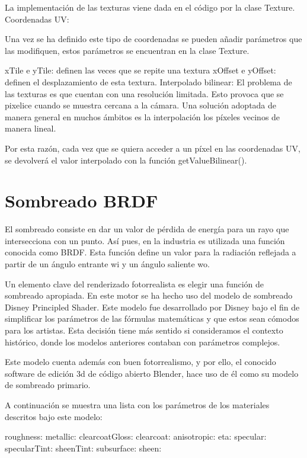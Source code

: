 	La implementación de las texturas viene dada en el código por la clase Texture.
	Coordenadas UV:

	Una vez se ha definido este tipo de coordenadas se pueden añadir parámetros que las modifiquen, estos parámetros se encuentran en la clase Texture.

	xTile e yTile: definen las veces que se repite una textura
	xOffset e yOffset: definen el desplazamiento de esta textura.
	Interpolado bilinear:
	El problema de las texturas es que cuentan con una resolución limitada. Esto provoca que se pixelice cuando se muestra cercana a la cámara. Una solución adoptada de manera general en muchos ámbitos es la interpolación los píxeles vecinos de manera lineal. 




	Por esta razón, cada vez que se quiera acceder a un píxel en las coordenadas UV, se devolverá el valor interpolado con la función getValueBilinear().

	
	\section{Sombreado BRDF}
	
		
	El sombreado consiste en dar un valor de pérdida de energía para un rayo que intersecciona con un punto. Así pues, en la industria es utilizada una función conocida como BRDF. Esta función define un valor para la radiación reflejada a partir de un ángulo entrante wi y un ángulo saliente wo.

	Un elemento clave del renderizado fotorrealista es elegir una función de sombreado apropiada. En este motor se ha hecho uso del modelo de sombreado Disney Principled Shader. Este modelo fue desarrollado por Disney bajo el fin de simplificar los parámetros de las fórmulas matemáticas y que estos sean cómodos para los artistas. Esta decisión tiene más sentido si consideramos el contexto histórico, donde los modelos anteriores contaban con parámetros complejos.

	Este modelo cuenta además con buen fotorrealismo, y por ello, el conocido software de edición 3d de código abierto Blender, hace uso de él como su modelo de sombreado primario.


	A continuación se muestra una lista con los parámetros de los materiales descritos bajo este modelo:

	roughness:
	metallic:
	clearcoatGloss:
	clearcoat:
	anisotropic:
	eta:
	specular:
	specularTint:
	sheenTint:
	subsurface:
	sheen:


